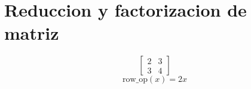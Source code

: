 \documentclass{article}%
\begin{document}
%
\normalsize%
\section{Reduccion y factorizacion de matriz}%
\label{sec:Reduccionyfactorizaciondematriz}%
\[%
\left[\begin{matrix}2 & 3\\3 & 4\end{matrix}\right]%
\]%
\[%
\mathrm{row\_op}(x) = 2 x%
\]

%
\end{document}
